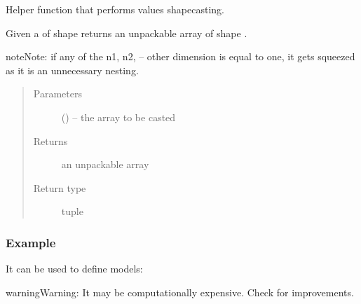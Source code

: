 \documentclass[letterpaper,10pt,english,openany,oneside]{sphinxmanual}
\begin{document}
\begin{fulllineitems}
\label{\detokenize{autogen:model.unpack_variables}}
Helper function that performs values shapecasting.

Given a  of shape 
returns an unpackable array of shape .

\begin{sphinxadmonition}{note}{Note:}
if any of the n1, n2, – other dimension is equal to one,
it gets squeezed as it is an unnecessary nesting.
\end{sphinxadmonition}
\begin{quote}\begin{description}
\item[{Parameters}] \leavevmode
{} () – the array to be casted

\item[{Returns}] \leavevmode
an unpackable array

\item[{Return type}] \leavevmode
tuple

\end{description}\end{quote}
\subsubsection*{Example}

It can be used to define models:

\begin{sphinxVerbatim}[commandchars=\\\{\}]
 
      
     
\end{sphinxVerbatim}

\begin{sphinxadmonition}{warning}{Warning:}
It may be computationally expensive. Check for improvements.
\end{sphinxadmonition}

\end{fulllineitems}
\end{document}

